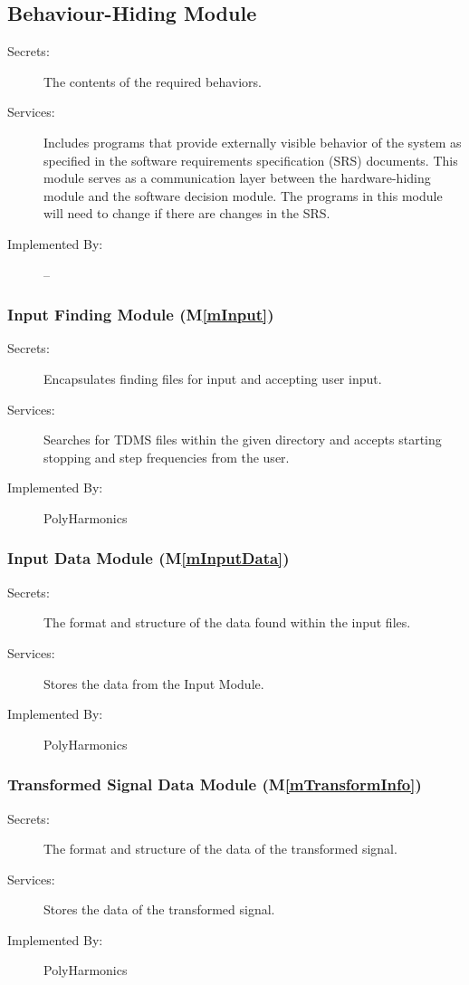 \documentclass[12pt]{article}
\newcommand{\mref}[1]{M\ref{#1}}
\newcommand{\progname}{PolyHarmonics}
\begin{document}
\subsection{Behaviour-Hiding Module}

\begin{description}
\item[Secrets:]The contents of the required behaviors.
\item[Services:]Includes programs that provide externally visible behavior of
  the system as specified in the software requirements specification (SRS)
  documents. This module serves as a communication layer between the
  hardware-hiding module and the software decision module. The programs in this
  module will need to change if there are changes in the SRS.
\item[Implemented By:] --
\end{description}

\subsubsection{Input Finding Module  (\mref{mInput})}	
\begin{description}
\item[Secrets:]Encapsulates finding files for input and accepting user input.
\item[Services:]Searches for TDMS files within the given directory and accepts 
starting stopping and step frequencies from the user.
\item[Implemented By:] \progname{}
\end{description}

\subsubsection{Input Data Module  (\mref{mInputData})}
\begin{description}
\item[Secrets:]The format and structure of the data found within the input 
files.
\item[Services:]Stores the data from the Input Module.
\item[Implemented By:] \progname{}
\end{description}
		
\subsubsection{Transformed Signal Data Module (\mref{mTransformInfo})}
\begin{description}
\item[Secrets:] The format and structure of the data of the transformed signal.
\item[Services:] Stores the data of the transformed signal.
\item[Implemented By:] \progname{}
\end{description}
\end{document}
